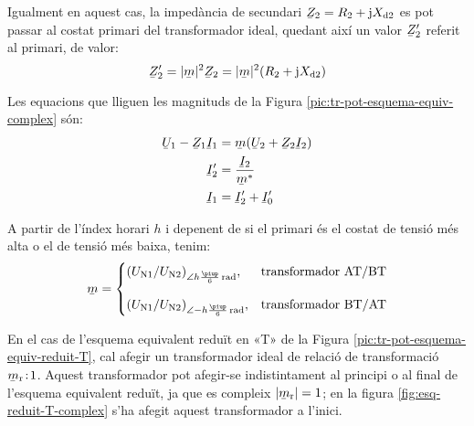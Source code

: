 \begin{center}
    
    \label{pic:tr-pot-esquema-equiv-complex}
\end{center}

Igualment en aquest cas, la impedància de secundari $\cmplx{Z}_2=R_2 + \ju X\ped{d2}$ es pot passar al costat primari del transformador ideal, quedant així un valor $\cmplx{Z}_2'$ referit al primari, de valor:
\begin{equation}
    \cmplx{Z}_2' = |\cmplx{m}|^2 \cmplx{Z}_2  = |\cmplx{m}|^2 (R_2 + \ju X\ped{d2})\label{eq:ZmZ}
\end{equation}

Les equacions que lliguen les magnituds de la Figura \vref{pic:tr-pot-esquema-equiv-complex} són:
\begin{subequations}
\begin{align}
    \cmplx{U}_1 - \cmplx{Z}_1 \cmplx{I}_1 &= \cmplx{m} ( \cmplx{U}_2  + \cmplx{Z}_2 \cmplx{I}_2 ) \label{eq:UmZ}\\
    \cmplx{I}'_2 &= \frac{\cmplx{I}_2}{\cmplx{m}^*} \label{eq:ImI}\\
    \cmplx{I}_1  &=   \cmplx{I}_2' + \cmplx{I}_0' \label{eq:III}
\end{align}
\end{subequations}

A partir de l'índex horari $h$ i depenent de si el primari és el costat de tensió més alta o el de tensió més baixa, tenim:
\begin{equation}
\cmplx{m} = \begin{cases}
     (U\ped{N1}/U\ped{N2})_{\angle h \frac{\piup}{6}\si{\,rad}}, & \text{transformador AT/BT}\\[2.7ex]
     (U\ped{N1}/U\ped{N2})_{\angle -h \frac{\piup}{6}\si{\,rad}}, & \text{transformador BT/AT}
\end{cases}
\label{eq:rel-transf-cmplx}
\end{equation}

En el cas de l'esquema equivalent reduït en «T» de la Figura \vref{pic:tr-pot-esquema-equiv-reduit-T}, cal afegir un transformador ideal de relació de transformació  $\cmplx{m}\ped{r}\!:\!1$. Aquest transformador pot afegir-se indistintament  al principi o al final de l'esquema equivalent reduït, ja que es compleix $|\cmplx{m}\ped{r}|=1$;  en la figura \vref{fig:esq-reduit-T-complex} s'ha afegit aquest transformador a l'inici.

